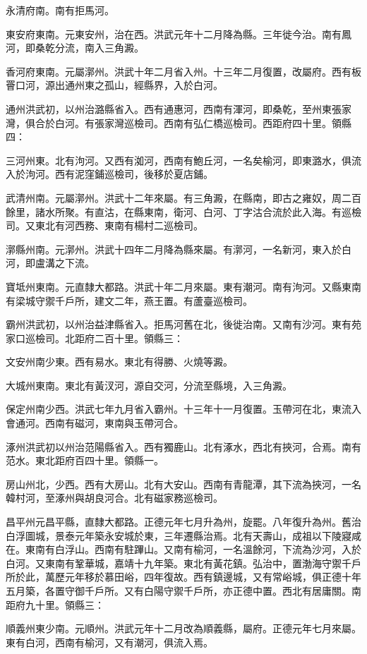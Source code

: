 永清府南。南有拒馬河。

東安府東南。元東安州，治在西。洪武元年十二月降為縣。三年徙今治。南有鳳河，即桑乾分流，南入三角澱。

香河府東南。元屬漷州。洪武十年二月省入州。十三年二月復置，改屬府。西有板罾口河，源出通州東之孤山，經縣界，入於白河。

通州洪武初，以州治潞縣省入。西有通惠河，西南有渾河，即桑乾，至州東張家灣，俱合於白河。有張家灣巡檢司。西南有弘仁橋巡檢司。西距府四十里。領縣四：

三河州東。北有泃河。又西有洳河，西南有鮑丘河，一名矣榆河，即東潞水，俱流入於泃河。西有泥窪鋪巡檢司，後移於夏店鋪。

武清州南。元屬漷州。洪武十二年來屬。有三角澱，在縣南，即古之雍奴，周二百餘里，諸水所聚。有直沽，在縣東南，衛河、白河、丁字沽合流於此入海。有巡檢司。又東北有河西務、東南有楊村二巡檢司。

漷縣州南。元漷州。洪武十四年二月降為縣來屬。有漷河，一名新河，東入於白河，即盧溝之下流。

寶坻州東南。元直隸大都路。洪武十年二月來屬。東有潮河。南有泃河。又縣東南有梁城守禦千戶所，建文二年，燕王置。有蘆臺巡檢司。

霸州洪武初，以州治益津縣省入。拒馬河舊在北，後徙治南。又南有沙河。東有苑家口巡檢司。北距府二百十里。領縣三：

文安州南少東。西有易水。東北有得勝、火燒等澱。

大城州東南。東北有黃汊河，源自交河，分流至縣境，入三角澱。

保定州南少西。洪武七年九月省入霸州。十三年十一月復置。玉帶河在北，東流入會通河。西南有磁河，東南與玉帶河合。

涿州洪武初以州治范陽縣省入。西有獨鹿山。北有涿水，西北有挾河，合焉。南有范水。東北距府百四十里。領縣一。

房山州北，少西。西有大房山。北有大安山。西南有青龍潭，其下流為挾河，一名韓村河，至涿州與胡良河合。北有磁家務巡檢司。

昌平州元昌平縣，直隸大都路。正德元年七月升為州，旋罷。八年復升為州。舊治白浮圖城，景泰元年築永安城於東，三年遷縣治焉。北有天壽山，成祖以下陵寢咸在。東南有白浮山。西南有駐蹕山。又南有榆河，一名溫餘河，下流為沙河，入於白河。又東南有鞏華城，嘉靖十九年築。東北有黃花鎮。弘治中，置渤海守禦千戶所於此，萬歷元年移於慕田峪，四年復故。西有鎮邊城，又有常峪城，俱正德十年五月築，各置守御千戶所。又有白陽守禦千戶所，亦正德中置。西北有居庸關。南距府九十里。領縣三：

順義州東少南。元順州。洪武元年十二月改為順義縣，屬府。正德元年七月來屬。東有白河，西南有榆河，又有潮河，俱流入焉。

